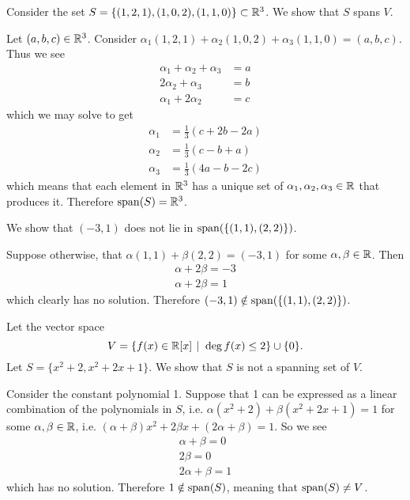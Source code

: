 \begin{example}
    Consider the set $S = \{(1, 2, 1), (1, 0, 2), (1, 1, 0)\} \subset \mathbb{R}^3$. We show that $S$ spans $V$.

    Let $(a, b, c) \in \mathbb{R}^3$. Consider $\alpha_1(1, 2, 1) + \alpha_2(1, 0, 2) + \alpha_3(1, 1, 0) = (a, b, c)$. Thus we see
    \begin{align*}
        \alpha_1 + \alpha_2 + \alpha_3 &= a\\
        2\alpha_2  + \alpha_3 &= b\\
        \alpha_1 + 2\alpha_2 &= c 
    \end{align*}
    which we may solve to get
    \begin{align*}
        \alpha_1 &= \frac13(c + 2b - 2a)\\
        \alpha_2 &= \frac13(c - b + a)\\
        \alpha_3 &= \frac13(4a - b - 2c)
    \end{align*}
    which means that each element in $\mathbb{R}^3$ has a unique set of $\alpha_1, \alpha_2, \alpha_3 \in \mathbb{R}$ that produces it. Therefore $\mathrm{span}(S) = \mathbb{R}^3$.
\end{example}

\begin{example}
    We show that $(-3, 1)$ does not lie in $\mathrm{span}(\{(1,1), (2,2)\})$.

    Suppose otherwise, that $\alpha(1,1) + \beta(2,2) = (-3,1)$ for some $\alpha, \beta \in \mathbb{R}$. Then
    \begin{align*}
        \alpha + 2\beta = -3\\
        \alpha + 2\beta = 1
    \end{align*}
    which clearly has no solution. Therefore $(-3, 1) \notin \mathrm{span}(\{(1, 1), (2, 2)\})$.
\end{example}

\begin{example}
    Let the vector space
    \[
        V = \{f(x) \in \R[x] \vert \deg f(x) \leq 2\} \cup \{0\}.
    \]
    Let $S = \{x^2 + 2, x^2 + 2x + 1\}$. We show that $S$ is not a spanning set of $V$.

    Consider the constant polynomial 1. Suppose that 1 can be expressed as a linear combination of the polynomials in $S$, i.e. $\alpha(x^2 + 2) + \beta(x^2+2x+1) = 1$ for some $\alpha, \beta \in \mathbb{R}$, i.e. $(\alpha + \beta)x^2 + 2\beta x + (2\alpha + \beta) = 1$. So we see
    \begin{align*}
        \alpha + \beta = 0\\
        2\beta = 0\\
        2\alpha + \beta = 1
    \end{align*}
    which has no solution. Therefore $1 \notin \mathrm{span}(S)$, meaning that $\mathrm{span}(S) \neq V$.
\end{example}

